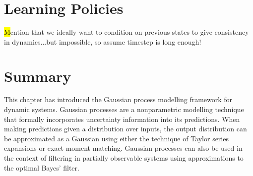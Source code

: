 \section{Learning Policies}
{\hl Mention that we ideally want to condition on previous states to give consistency in dynamics...but impossible, so assume timestep is long enough!}


\section{Summary}
This chapter has introduced the Gaussian process modelling framework for dynamic systems. Gaussian processes are a nonparametric modelling technique that formally incorporates uncertainty information into its predictions. When making predictions given a distribution over inputs, the output distribution can be approximated as a Gaussian using either the technique of Taylor series expansions or exact moment matching. Gaussian processes can also be used in the context of filtering in partially observable systems using approximations to the optimal Bayes' filter.

